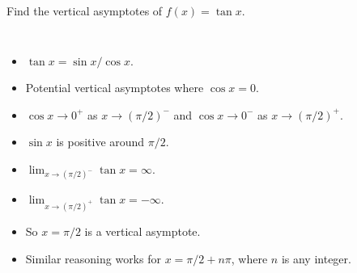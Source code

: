 \begin{frame}
\begin{example}[Example 10, p. 74]
Find the vertical asymptotes of $f(x) = \tan x$.
\begin{columns}[c]
%

%
\begin{itemize}
\item<2->  $\tan x = \sin x/\cos x$.  
\item<3->  Potential vertical asymptotes where $\cos x = 0$.  
\item<4->  $\cos x \rightarrow 0^+$ as $x\rightarrow (\pi /2)^-$ and $\cos x\rightarrow 0^-$ as $x\rightarrow (\pi /2)^+$.
\item<5->  $\sin x$ is positive around $\pi /2$. 
\item<6->  $\lim_{x\rightarrow (\pi /2)^-} \tan x = \infty$.
\item<7->  $\lim_{x\rightarrow (\pi /2)^+} \tan x = -\infty$.
\item<8->  So $x = \pi/2$ is a vertical asymptote.
\item<9->  Similar reasoning works for $x = \pi/2 + n\pi$, where $n$ is any integer. 
\end{itemize}
\end{columns}
\end{example}
\end{frame}
